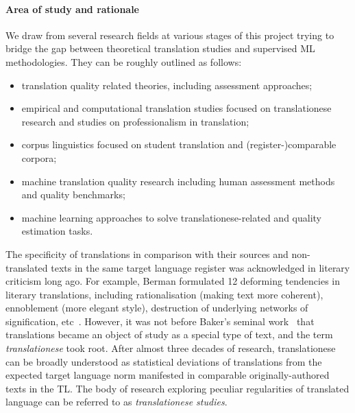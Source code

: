 \paragraph{Area of study and rationale} 

We draw from several research fields at various stages of this project trying to bridge the gap between theoretical translation studies and supervised \gls{ML} methodologies. They can be roughly outlined as follows:
\begin{itemize}\compresslist{}
	\item translation quality related theories, including assessment approaches;
	\item empirical and computational translation studies focused on translationese research and studies on professionalism in translation;
	\item corpus linguistics focused on student translation and (register-)comparable corpora;
	\item machine translation quality research including human assessment methods and quality benchmarks;
	\item machine learning approaches to solve translationese-related and quality estimation tasks.
\end{itemize}

The specificity of translations in comparison with their sources and non-translated texts in the same target language register was acknowledged in literary criticism long ago. For example, Berman formulated 12 deforming tendencies in literary translations, including rationalisation (making text more coherent), ennoblement (more elegant style), destruction of underlying networks of signification, etc~\cite{Berman1985}. However, it was not before Baker's seminal work~\citep{Baker1993} that translations became an object of study as a special type of text, and the term \textit{translationese} took root. After almost three decades of research, translationese can be broadly understood as statistical deviations of translations from the expected target language norm manifested in comparable originally-authored texts in the \gls{TL}. The body of research exploring peculiar regularities of translated language can be referred to as \textit{translationese studies}. 

